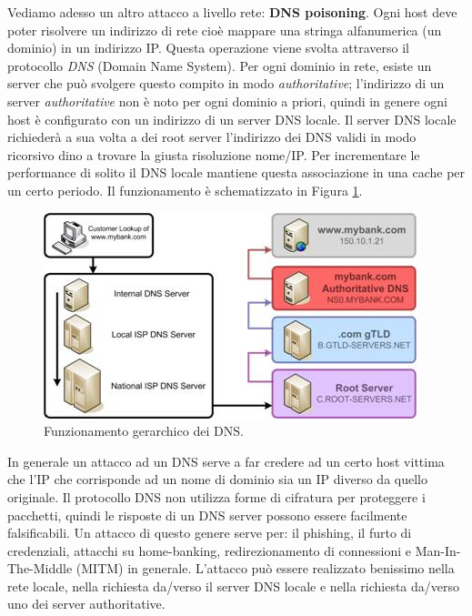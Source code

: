 Vediamo adesso un altro attacco a livello rete: \textbf{DNS poisoning}. Ogni host deve poter risolvere un indirizzo di rete cioè mappare una stringa alfanumerica (un dominio) in un indirizzo IP. Questa operazione viene svolta attraverso il protocollo \textit{DNS} (Domain Name System). Per ogni dominio in rete, esiste un server che può svolgere questo compito in modo \textit{authoritative}; l'indirizzo di un server \textit{authoritative} non è noto per ogni dominio a priori, quindi in genere ogni host è configurato con un indirizzo di un server DNS locale. Il server DNS locale richiederà a sua volta a dei root server l'indirizzo dei DNS validi in modo ricorsivo dino a trovare la giusta risoluzione nome/IP. Per incrementare le performance di solito il DNS locale mantiene questa associazione in una cache per un certo periodo. Il funzionamento è schematizzato in Figura \ref{img:DNS}.
\begin{figure}[htbp]
	\centering
	\includegraphics[scale = 0.7]{images/DNS}
	\caption{Funzionamento gerarchico dei DNS.}
	\label{img:DNS}
\end{figure}
\noindent
In generale un attacco ad un DNS serve a far credere ad un certo host vittima che l'IP che corrisponde ad un nome di dominio sia un IP diverso da quello originale. Il protocollo DNS non utilizza forme di cifratura per proteggere i pacchetti, quindi le risposte di un DNS server possono essere facilmente falsificabili. Un attacco di questo genere serve per: il phishing, il furto di credenziali, attacchi su home-banking, redirezionamento di connessioni e Man-In-The-Middle (MITM) in generale. L'attacco può essere realizzato benissimo nella rete locale, nella richiesta da/verso il server DNS locale e nella richiesta da/verso uno dei server authoritative.\\
